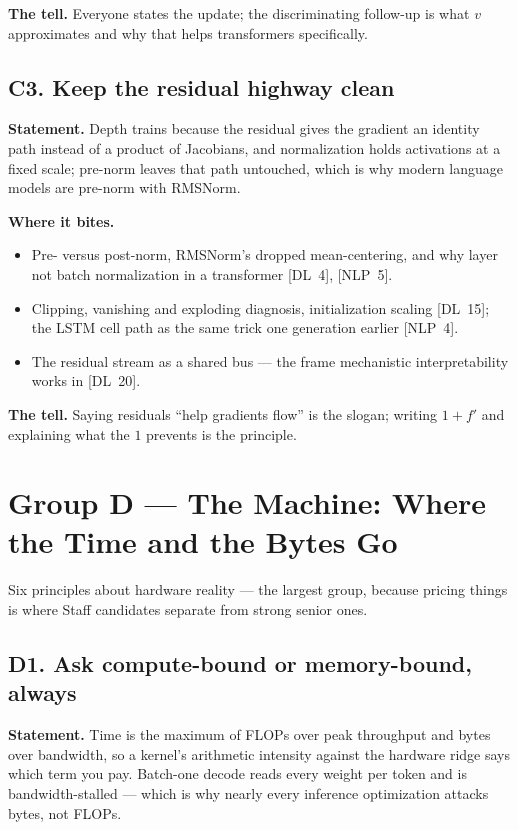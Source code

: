 \textbf{The tell.} Everyone states the update; the discriminating follow-up is what $v$ approximates and why that helps transformers specifically.

\subsection*{C3. Keep the residual highway clean}

\textbf{Statement.} Depth trains because the residual gives the gradient an identity path instead of a product of Jacobians, and normalization holds activations at a fixed scale; pre-norm leaves that path untouched, which is why modern language models are pre-norm with RMSNorm.

\textbf{Where it bites.}
\begin{itemize}[itemsep=1pt,topsep=2pt,leftmargin=1.3em]
\item Pre- versus post-norm, RMSNorm's dropped mean-centering, and why layer not batch normalization in a transformer [DL~4], [NLP~5].
\item Clipping, vanishing and exploding diagnosis, initialization scaling [DL~15]; the LSTM cell path as the same trick one generation earlier [NLP~4].
\item The residual stream as a shared bus --- the frame mechanistic interpretability works in [DL~20].
\end{itemize}

\textbf{The tell.} Saying residuals ``help gradients flow'' is the slogan; writing $1 + f'$ and explaining what the $1$ prevents is the principle.

\section*{Group D --- The Machine: Where the Time and the Bytes Go}

Six principles about hardware reality --- the largest group, because pricing things is where Staff candidates separate from strong senior ones.

\subsection*{D1. Ask compute-bound or memory-bound, always}

\textbf{Statement.} Time is the maximum of FLOPs over peak throughput and bytes over bandwidth, so a kernel's arithmetic intensity against the hardware ridge says which term you pay. Batch-one decode reads every weight per token and is bandwidth-stalled --- which is why nearly every inference optimization attacks bytes, not FLOPs.


